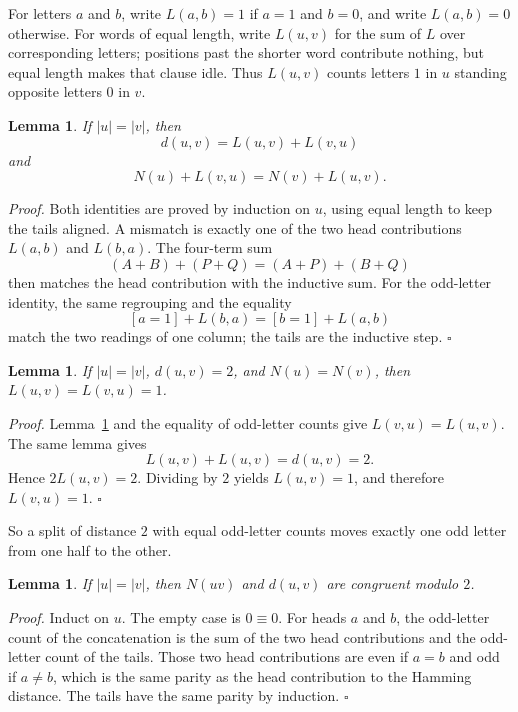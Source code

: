 \documentclass[11pt,letterpaper]{article}
\newtheorem{lemma}[theorem]{Lemma}
\newenvironment{proof}{\noindent\textit{Proof.}}{\hfill\(\square\)}
\begin{document}
For letters \(a\) and \(b\), write \(L(a,b)=1\) if \(a=1\) and \(b=0\), and write \(L(a,b)=0\) otherwise. For words of equal length, write \(L(u,v)\) for the sum of \(L\) over corresponding letters; positions past the shorter word contribute nothing, but equal length makes that clause idle. Thus \(L(u,v)\) counts letters \(1\) in \(u\) standing opposite letters \(0\) in \(v\).

\begin{lemma}
\label{lem:split}
If \(|u|=|v|\), then
\[
d(u,v)=L(u,v)+L(v,u)
\]
and
\[
N(u)+L(v,u)=N(v)+L(u,v).
\]
\end{lemma}

\begin{proof}
Both identities are proved by induction on \(u\), using equal length to keep the tails aligned. A mismatch is exactly one of the two head contributions \(L(a,b)\) and \(L(b,a)\). The four-term sum
\[
(A+B)+(P+Q)=(A+P)+(B+Q)
\]
then matches the head contribution with the inductive sum. For the odd-letter identity, the same regrouping and the equality
\[
[a=1]+L(b,a)=[b=1]+L(a,b)
\]
match the two readings of one column; the tails are the inductive step.
\end{proof}

\begin{lemma}
\label{lem:shape}
If \(|u|=|v|\), \(d(u,v)=2\), and \(N(u)=N(v)\), then \(L(u,v)=L(v,u)=1\).
\end{lemma}

\begin{proof}
Lemma~\ref{lem:split} and the equality of odd-letter counts give \(L(v,u)=L(u,v)\). The same lemma gives
\[
L(u,v)+L(u,v)=d(u,v)=2.
\]
Hence \(2L(u,v)=2\). Dividing by \(2\) yields \(L(u,v)=1\), and therefore \(L(v,u)=1\).
\end{proof}

So a split of distance \(2\) with equal odd-letter counts moves exactly one odd letter from one half to the other.

\begin{lemma}
\label{lem:parity}
If \(|u|=|v|\), then \(N(uv)\) and \(d(u,v)\) are congruent modulo \(2\).
\end{lemma}

\begin{proof}
Induct on \(u\). The empty case is \(0\equiv 0\). For heads \(a\) and \(b\), the odd-letter count of the concatenation is the sum of the two head contributions and the odd-letter count of the tails. Those two head contributions are even if \(a=b\) and odd if \(a\neq b\), which is the same parity as the head contribution to the Hamming distance. The tails have the same parity by induction.
\end{proof}
\end{document}
